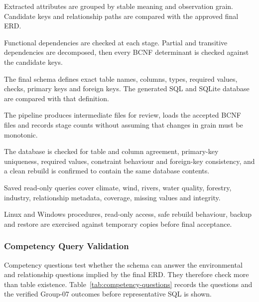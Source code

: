 \begin{description}[style=nextline]
  \item[Relational-model refinement.] Extracted attributes are grouped by
  stable meaning and observation grain. Candidate keys and relationship paths
  are compared with the approved final ERD.
  \item[Normal-form evaluation.] Functional dependencies are checked at each
  stage. Partial and transitive dependencies are decomposed, then every BCNF
  determinant is checked against the candidate keys.
  \item[Schema implementation.] The final schema defines exact table
  names, columns, types, required values, checks, primary keys and foreign keys.
  The generated SQL and SQLite database are compared with that definition.
  \item[Normalization and ETL execution.] The pipeline produces intermediate
  files for review, loads the accepted BCNF files and records stage counts
  without assuming that changes in grain must be monotonic.
  \item[Database verification.] The database is checked for table and column
  agreement, primary-key uniqueness, required values, constraint behaviour and
  foreign-key consistency, and a clean rebuild is confirmed to contain the same
  database contents.
  \item[Query and demonstration preparation.] Saved read-only queries cover
  climate, wind, rivers, water quality, forestry, industry, relationship
  metadata, coverage, missing values and integrity.
  \item[Deployment and maintenance checks.] Linux and Windows procedures,
  read-only access, safe rebuild behaviour, backup and restore are exercised
  against temporary copies before final acceptance.
\end{description}

\subsubsection{Competency Query Validation}
\label{subsec:competency-query}

Competency questions test whether the schema can answer the environmental and
relationship questions implied by the final ERD. They therefore check more
than table existence. Table~\ref{tab:competency-questions} records the questions
and the verified Group-07 outcomes before representative SQL is shown.

